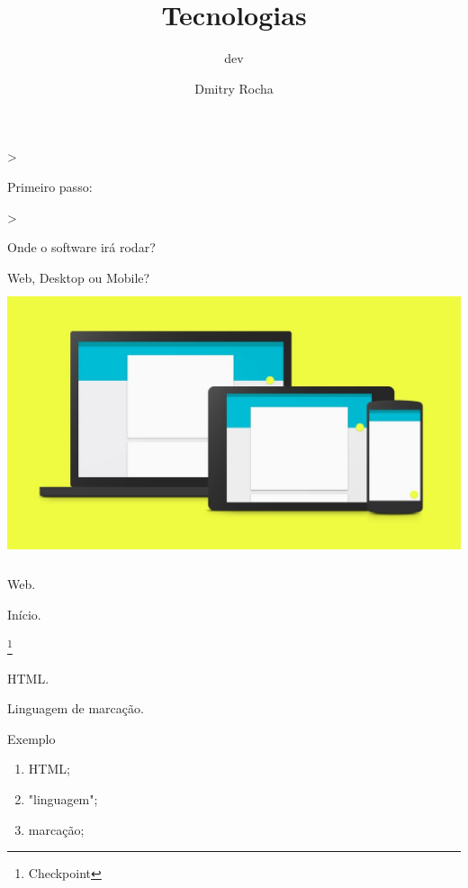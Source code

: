 \documentclass[xcolor=dvipsnames]{beamer}
\title{Tecnologias}
\author{Dmitry Rocha}
\subtitle{dev}
\institute{scoola}
\begin{document}
  \begin{frame}
    \titlepage
  \end{frame}

  \begin{frame}{>}
    \begin{center}
      \Huge Primeiro passo:
    \end{center}
  \end{frame}

  \begin{frame}{>}
    \begin{center}
      \Huge Onde o software irá rodar?
    \end{center}
  \end{frame}

  \begin{frame}
    \begin{center}
      \Huge Web, Desktop ou Mobile?
      \includegraphics[width=14.5cm, height=8cm ]{images/material}
    \end{center}
  \end{frame}

  \begin{frame}
    \Huge Web.

    \normalsize Início.

    \let\thefootnote\relax\footnote{Checkpoint}
  \end{frame}

  \begin{frame}
    \Huge HTML.

    \normalsize Linguagem de marcação.
  \end{frame}

  \begin{frame}{Exemplo}
    \huge

    \begin{enumerate}
      \item HTML;
      \item "linguagem";
      \item marcação;
    \end{enumerate}
  \end{frame}
\end{document}
